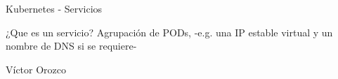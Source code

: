 \documentclass[aspectratio=169]{beamer}
\begin{document}
\begin{frame}{Kubernetes - Servicios}
    
    \begin{alertblock}{¿Que es un servicio?}
        Agrupación de PODs, -e.g. una IP estable virtual y un nombre de DNS si se requiere-
    \end{alertblock}
    
    
\end{frame}

\begin{frame}{Víctor Orozco}
\begin{columns}[T] %
	
	\begin{column}[T]{4cm} %
		\begin{figure}
			\centering

\end{figure}
\end{column}
\end{columns}
\end{frame}
\end{document}
